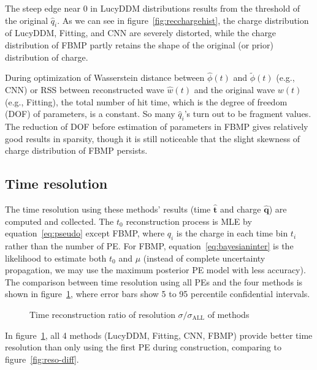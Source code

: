 The steep edge near 0 in LucyDDM distributions results from the threshold of the original $\hat{q}_i$. As we can see in figure~\ref{fig:recchargehist}, the charge distribution of LucyDDM, Fitting, and CNN are severely distorted, while the charge distribution of FBMP partly retains the shape of the original (or prior) distribution of charge. 

During optimization of Wasserstein distance between $\hat{\phi}(t)$ and $\tilde{\phi}(t)$ (e.g., CNN) or RSS between reconstructed wave $\hat{w}(t)$ and the original wave $w(t)$ (e.g., Fitting), the total number of hit time, which is the degree of freedom (DOF) of parameters, is a constant. So many $\hat{q}_i$'s turn out to be fragment values. The reduction of DOF before estimation of parameters in FBMP gives relatively good results in sparsity, though it is still noticeable that the slight skewness of charge distribution of FBMP persists. 

\subsection{Time resolution}
\label{subsec:timeresolution}


The time resolution using these methods' results (time $\bm{\hat{t}}$ and charge $\bm{\hat{q}}$) are computed and collected. The $t_{0}$ reconstruction process is MLE by equation~\eqref{eq:pseudo} except FBMP, where $q_{i}$ is the charge in each time bin $t_{i}$ rather than the number of PE. For FBMP, equation~\eqref{eq:bayesianinter} is the likelihood to estimate both $t_{0}$ and $\mu$ (instead of complete uncertainty propagation, we may use the maximum posterior PE model with less accuracy). The comparison between time resolution using all PEs and the four methods is shown in figure~\ref{fig:deltamethods}, where error bars show 5 to 95 percentile confidential intervals. 

\begin{figure}[H]
    \centering
    \resizebox{\textwidth}{!}{}
    \caption{\label{fig:deltamethods} Time reconstruction ratio of resolution $\sigma/\sigma_{\mathrm{ALL}}$ of methods}
\end{figure}

In figure~\ref{fig:deltamethods}, all 4 methods (LucyDDM, Fitting, CNN, FBMP) provide better time resolution than only using the first PE during construction, comparing to figure~\ref{fig:reso-diff}. 

